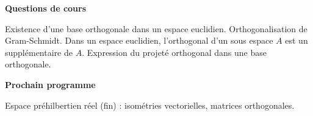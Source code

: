






\bigskip
\begin{center}
 \textbf{Questions de cours}
\end{center}
Existence d'une base orthogonale dans un espace euclidien. Orthogonalisation de Gram-Schmidt. Dans un espace euclidien, l'orthogonal d'un sous espace $A$ est un supplémentaire de $A$. Expression du projeté orthogonal dans une base orthogonale.
\begin{center}
 \textbf{Prochain programme}
\end{center}
Espace préhilbertien réel (fin) : isométries vectorielles, matrices orthogonales.

